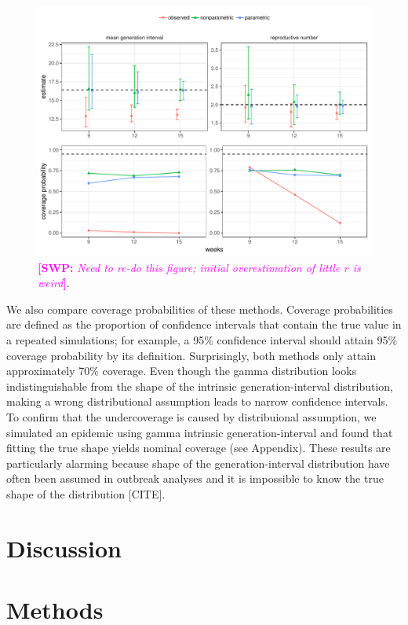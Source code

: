 \documentclass[12pt]{article}
\newcommand{\comment}[3]{\textcolor{#1}{\textbf{[#2: }\textsl{#3}\textbf{]}}}
\newcommand{\swp}[1]{\comment{magenta}{SWP}{#1}}
\begin{document}
\begin{figure}
\includegraphics[width=\textwidth]{../fig/compare_methods.pdf}
\caption{\swp{Need to re-do this figure; initial overestimation of little $r$ is weird}.}
\label{fig:test}
\end{figure}

We also compare coverage probabilities of these methods. 
Coverage probabilities are defined as the proportion of confidence intervals that contain the true value in a repeated simulations; for example, a 95\% confidence interval should attain 95\% coverage probability by its definition.
Surprisingly, both methods only attain approximately 70\% coverage.
Even though the gamma distribution looks indistinguishable from the shape of the intrinsic generation-interval distribution, making a wrong distributional assumption leads to narrow confidence intervals.
To confirm that the undercoverage is caused by distribuional assumption, we simulated an epidemic using gamma intrinsic generation-interval and found that fitting the true shape yields nominal coverage (see Appendix).
These results are particularly alarming because shape of the generation-interval distribution have often been assumed in outbreak analyses and it is impossible to know the true shape of the distribution [CITE].


\clearpage

\section{Discussion}

\section{Methods}
\end{document}
